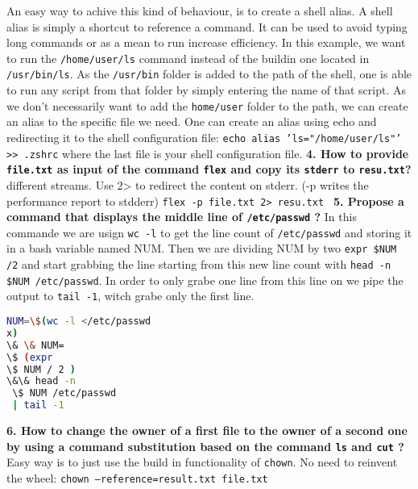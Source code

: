 \documentclass[a4paper,oneside,onecolumn]{article}
\newcommand{\code}[1]{\colorbox{codegray}{\texttt{#1}}}
\begin{document}
\newline
\newline
An easy way to achive this kind of behaviour, is to create a shell alias. A shell alias is simply a shortcut to reference a command. It can be used to avoid typing long commands or as a mean to run increase efficiency.
In this example, we want to run the \texttt{/home/user/ls} command instead of the buildin one located in \texttt{/usr/bin/ls}. As the \texttt{/usr/bin} folder is added to the path of the shell, one is able to run any script from that folder by simply entering the name of that script.
\newline
As we don't necessarily want to add the \texttt{home/user} folder to the path, we can create an alias to the specific file we need. 
\newline
\newline
One can create an alias using echo and redirecting it to the shell configuration file: 
\newline
\code{echo alias 'ls="/home/user/ls"' >> .zshrc} where the last file is your shell configuration file.
\newline
\newline
\noindent
\textbf{4. How to provide \texttt{file.txt} as input of the command \code{flex} and copy its \texttt{stderr} to \texttt{resu.txt}?}
\newline
{} different streams. Use 2> to redirect the content on stderr. (-p writes the performance report to stdderr)
\newline
\code{flex -p file.txt 2> resu.txt }
\newline
\newline
\noindent
\textbf{5. Propose a command that displays the middle line of \texttt{/etc/passwd} ?}
\newline
\newline
In this commande we are usign \code{wc -l} to get the line count of \texttt{/etc/passwd} and storing it in a bash variable named NUM. Then we are dividing NUM by two \code{expr \$NUM /2} and start grabbing the line starting from this new line count with \code{head -n \$NUM /etc/passwd}. In order to only grabe one line from this line on we pipe the output to \code{tail -1}, witch grabe only the first line.
\newline
\begin{lstlisting}[language=bash,caption={bash version}]NUM=\$(wc -l </etc/passwd
x)
\& \& NUM=
\$ (expr 
\$ NUM / 2 )
\&\& head -n 
 \$ NUM /etc/passwd
 | tail -1
\end{lstlisting}
\noindent
\textbf{6. How to change the owner of a first file to the owner of a second one by using a command substitution based on the command \code{ls} and \code{cut} ?}
\newline
\newline
Easy way is to just use the build in functionality of \code{chown}. No need to reinvent the wheel:
\newline
\code{chown --reference=result.txt file.txt}
\end{document}
